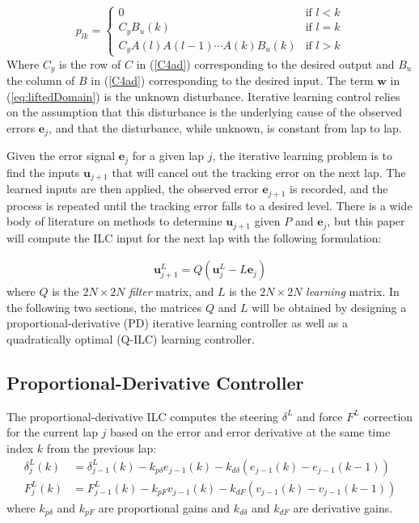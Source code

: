 \documentclass[9pt,shortpaper,twoside,web]{ieeecolor}
\begin{document}
\begin{equation}
\label{eq:how2Lift}
p_{lk} = \begin{cases} 0 &\mbox{if } l < k \\ 
C_yB_u(k) & \mbox{if } l = k \\
C_yA(l)A(l-1)\cdots A(k)B_u(k) &\mbox{if } l > k \end{cases}
\end{equation} 
Where $C_y$ is the row of $C$ in (\ref{C4ad}) corresponding to the desired output and $B_u$ the column of $B$ in (\ref{C4ad})
corresponding to the desired input. The term $\mathbf{w}$ in (\ref{eq:liftedDomain}) is the unknown disturbance. Iterative
learning control relies on the assumption that this disturbance is the underlying cause of the observed errors $\mathbf{e}_j$, and that the disturbance, while unknown, is constant from lap to lap.

Given the error signal $\mathbf{e}_j$ for a given lap $j$, the iterative learning problem is to find the inputs $\mathbf{u}_{j+1}$ that will cancel out the tracking error on the next lap. The learned inputs are then applied, the observed error $\mathbf{e}_{j+1}$ is recorded,
and the process is repeated until the tracking error falls to a desired level. There is a wide body of literature on methods to determine $\mathbf{u}_{j+1}$ given $P$ and $\mathbf{e}_j$, but this paper will compute the ILC input for the next lap with the following formulation:

\begin{align}
 \label{eqn:ctrlLaw}
 \mathbf{u}^L_{j\!+\!1} = Q(\mathbf{u}^L_j - L\mathbf{e}_j)
\end{align}
where $Q$ is the $2N \times 2N$ \textit{filter} matrix, and $L$ is the $2N \times 2N$ \textit{learning} matrix. 
In the following two sections, the
matrices $Q$ and $L$ will be obtained by designing a proportional-derivative (PD) iterative learning controller as well as a quadratically
optimal (Q-ILC) learning controller.

\subsection{Proportional-Derivative Controller}
\label{sec:pdcontroller}

The proportional-derivative ILC computes the steering $\delta^L$ and force $F^L$ correction for the current lap $j$ based on the error and 
error derivative at the same time index $k$ from the previous lap:
\begin{align}
	\label{eq:PDlaw}
	\delta^L_{j}(k) &= \delta^L_{j\!-\!1}(k) - k_{p\delta}e_{j\!-\!1}(k) - k_{d\delta}(e_{j\!-\!1}(k) - e_{j\!-\!1}(k-1))\\
	    F^L_{j}(k) &=  F^L_{j-1}(k) - k_{pF}v_{j\!-\!1}(k) - k_{dF}(v_{j\!-\!1}(k) - v_{j\!-\!1}(k-1))
\end{align}
where $k_{p\delta}$ and $k_{pF}$ are proportional gains and $k_{d\delta}$ and $k_{dF}$ are derivative gains. 
 
\end{document}
